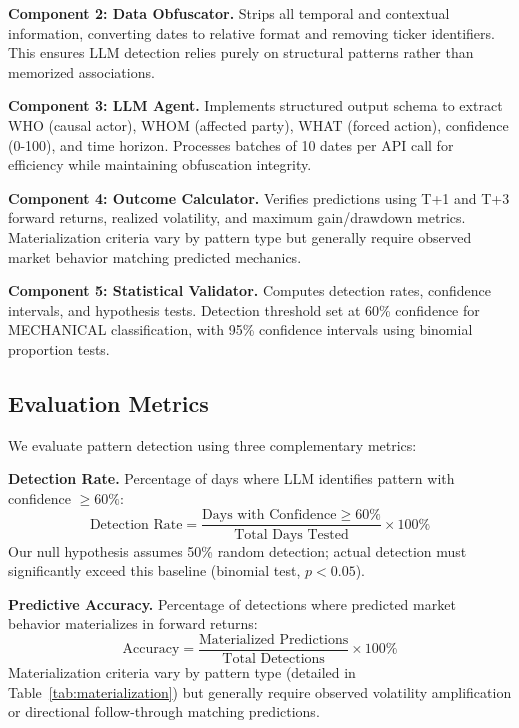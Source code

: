 \textbf{Component 2: Data Obfuscator.} Strips all temporal and contextual information, converting dates to relative format and removing ticker identifiers. This ensures LLM detection relies purely on structural patterns rather than memorized associations.

\textbf{Component 3: LLM Agent.} Implements structured output schema to extract WHO (causal actor), WHOM (affected party), WHAT (forced action), confidence (0-100), and time horizon. Processes batches of 10 dates per API call for efficiency while maintaining obfuscation integrity.

\textbf{Component 4: Outcome Calculator.} Verifies predictions using T+1 and T+3 forward returns, realized volatility, and maximum gain/drawdown metrics. Materialization criteria vary by pattern type but generally require observed market behavior matching predicted mechanics.

\textbf{Component 5: Statistical Validator.} Computes detection rates, confidence intervals, and hypothesis tests. Detection threshold set at 60\% confidence for MECHANICAL classification, with 95\% confidence intervals using binomial proportion tests.

\subsection{Evaluation Metrics}

We evaluate pattern detection using three complementary metrics:

\medskip
\textbf{Detection Rate.} Percentage of days where LLM identifies pattern with confidence $\geq 60\%$:
\begin{equation}
\text{Detection Rate} = \frac{\text{Days with Confidence} \geq 60\%}{\text{Total Days Tested}} \times 100\%
\end{equation}
Our null hypothesis assumes 50\% random detection; actual detection must significantly exceed this baseline (binomial test, $p < 0.05$).
\medskip

\textbf{Predictive Accuracy.} Percentage of detections where predicted market behavior materializes in forward returns:
\begin{equation}
\text{Accuracy} = \frac{\text{Materialized Predictions}}{\text{Total Detections}} \times 100\%
\end{equation}
Materialization criteria vary by pattern type (detailed in Table~\ref{tab:materialization}) but generally require observed volatility amplification or directional follow-through matching predictions.

